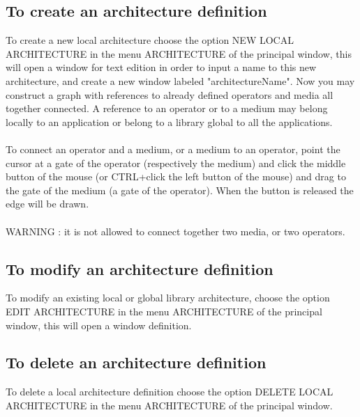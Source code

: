 \documentclass[11pt,twoside]{report}
\begin{document}
\subsection{To create an architecture definition}
To create a new local architecture choose the option NEW LOCAL ARCHITECTURE in the menu ARCHITECTURE of the principal window, this will open a window for text edition in order to input a name to this new architecture, and create a new window labeled "architectureName". Now you may construct a graph with references to already defined operators and media all together connected. A reference to an operator or to a medium may belong locally to an application or belong to a library global to all the applications.\\\\
To connect an operator and a medium, or a medium to an operator, point the cursor at a gate of the operator (respectively the medium) and click the middle button of the mouse (or CTRL+click the left button of the mouse) and drag to the gate of the medium (a gate of the operator). When the button is released the edge will be drawn.\\\\
WARNING : it is not allowed to connect together two media, or two operators.

\subsection{To modify an architecture definition}
To modify an existing local or global library architecture, choose the option EDIT ARCHITECTURE in the menu ARCHITECTURE of the principal window, this will open a window definition.

\subsection{To delete an architecture definition}
To delete a local architecture definition choose the option DELETE LOCAL ARCHITECTURE in the menu ARCHITECTURE of the principal window.
\end{document}
